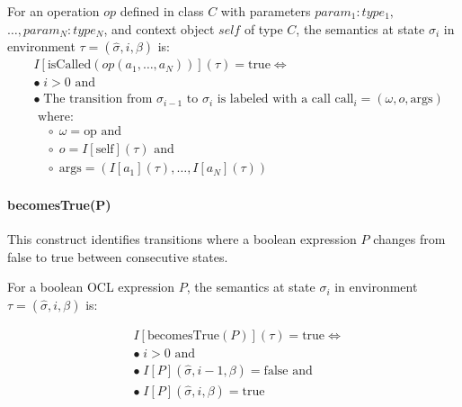 For an operation $op$ defined in class $C$ with parameters 
$param_1: type_1,$ $\ldots, param_N: type_N$, and context object $self$ of type $C$, 
the semantics at state $\sigma_i$ in environment $\tau = (\hat{\sigma}, i, \beta)$ 
is:
\begin{equation}
    \begin{split}
    & I[\text{isCalled}(op(a_1, \ldots, a_N))](\tau) = \text{true} \iff \\
    & \bullet\; i > 0 \text{ and} \\
    & \bullet\; \text{The transition from } \sigma_{i-1} \text{ to } \sigma_i \text{ is labeled with a call } \text{call}_i = (\omega, o, \text{args}) \\
    & \text{ where:} \\
    & \quad \circ\; \omega = \text{op} \text{ and} \\
    & \quad \circ\; o = I[\text{self}](\tau) \text{ and} \\
    & \quad \circ\; \text{args} = (I[a_1](\tau), \ldots, I[a_N](\tau))
    \end{split}
\end{equation}

\paragraph{becomesTrue(P)}
This construct identifies transitions where a boolean expression $P$ changes from 
false to true between consecutive states.

For a boolean OCL expression $P$, the semantics at state $\sigma_i$ in environment 
$\tau = (\hat{\sigma}, i, \beta)$ is:

\begin{equation}
    \begin{split}
    & I[\text{becomesTrue}(P)](\tau) = \text{true} \iff \\
    & \bullet\; i > 0 \text{ and} \\
    & \bullet\; I[P](\hat{\sigma}, i-1, \beta) = \text{false} \text{ and} \\
    & \bullet\; I[P](\hat{\sigma}, i, \beta) = \text{true}
    \end{split}
\end{equation}

